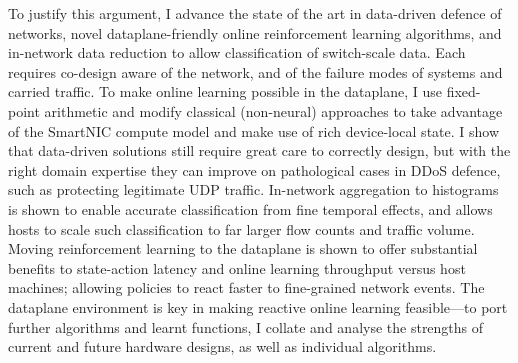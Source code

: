 To justify this argument, I advance the state of the art in data-driven defence of networks, novel dataplane-friendly online reinforcement learning algorithms, and in-network data reduction to allow classification of switch-scale data.
Each requires co-design aware of the network, and of the failure modes of systems and carried traffic.
To make online learning possible in the dataplane, I use fixed-point arithmetic and modify classical (non-neural) approaches to take advantage of the SmartNIC compute model and make use of rich device-local state.
I show that data-driven solutions still require great care to correctly design, but with the right domain expertise they can improve on pathological cases in DDoS defence, such as protecting legitimate UDP traffic.
In-network aggregation to histograms is shown to enable accurate classification from fine temporal effects, and allows hosts to scale such classification to far larger flow counts and traffic volume.
Moving reinforcement learning to the dataplane is shown to offer substantial benefits to state-action latency and online learning throughput versus host machines; allowing policies to react faster to fine-grained network events.
The dataplane environment is key in making reactive online learning feasible---to port further algorithms and learnt functions, I collate and analyse the strengths of current and future hardware designs, as well as individual algorithms.


